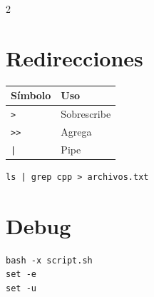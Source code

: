 \documentclass[10pt]{article}
\begin{document}
\begin{multicols}{2}
\section*{Redirecciones}

\begin{center}
\begin{tabular}{ll}
\toprule
Símbolo & Uso \\
\midrule
\texttt{>} & Sobrescribe \\
\texttt{>>} & Agrega \\
\texttt{|} & Pipe \\
\bottomrule
\end{tabular}
\end{center}

\begin{lstlisting}
ls | grep cpp > archivos.txt
\end{lstlisting}

\section*{Debug}

\begin{lstlisting}
bash -x script.sh
set -e
set -u
\end{lstlisting}

\end{multicols}
\end{document}
